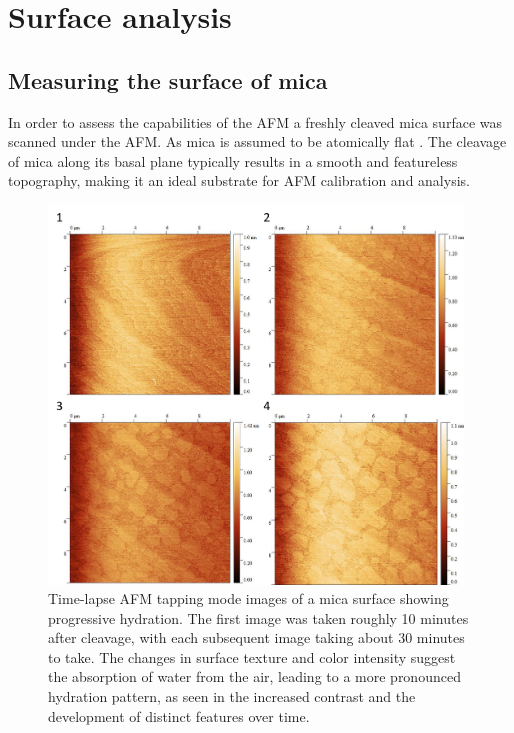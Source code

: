 \section{Surface analysis}

\subsection{Measuring the surface of mica}

In order to assess the capabilities of the AFM a freshly cleaved mica surface was scanned under the AFM. As mica is assumed to be atomically flat \cite{MicaSurf, Ostendorf_2008}. The cleavage of mica along its basal plane typically results in a smooth and featureless topography, making it an ideal substrate for AFM calibration and analysis.

\begin{figure}[h!!!!!!!]     %
        \begin{center}
          \includegraphics[width=110mm]{chapter3/Mica hydration.png}
\end{center}
\caption{Time-lapse AFM tapping mode images of a mica surface showing progressive hydration. The first image was taken roughly 10 minutes after cleavage, with each subsequent image taking about 30 minutes to take. The changes in surface texture and color intensity suggest the absorption of water from the air, leading to a more pronounced hydration pattern, as seen in the increased contrast and the development of distinct features over time.}
\label{fig:ImageAFM2}                 %
\end{figure}

